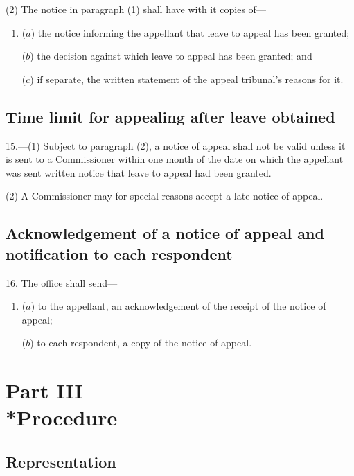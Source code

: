 \documentclass[12pt,a4paper]{article}
\begin{document}
(2) The notice in paragraph (1) shall have with it copies of---
\begin{enumerate}\item[]
($a$) the notice informing the appellant that leave to appeal has been granted;

($b$) the decision against which leave to appeal has been granted; and

($c$) if separate, the written statement of the appeal tribunal’s reasons for it.
\end{enumerate}

\subsection[15. Time limit for appealing after leave obtained]{Time limit for appealing after leave obtained}

15.—(1) Subject to paragraph (2), a notice of appeal shall not be valid unless it is sent to a Commissioner within one month of the date on which the appellant was sent written notice that leave to appeal had been granted.

(2) A Commissioner may for special reasons accept a late notice of appeal.

\subsection[16. Acknowledgement of a notice of appeal and notification to each respondent]{Acknowledgement of a notice of appeal and notification to each respondent}

16.  The office shall send---
\begin{enumerate}\item[]
($a$) to the appellant, an acknowledgement of the receipt of the notice of appeal;

($b$) to each respondent, a copy of the notice of appeal.
\end{enumerate}

\section[Part III --- Procedure]{Part III\\*Procedure}

\subsection[17. Representation]{Representation}

\renewcommand\parthead{--- Part III}
\end{document}
